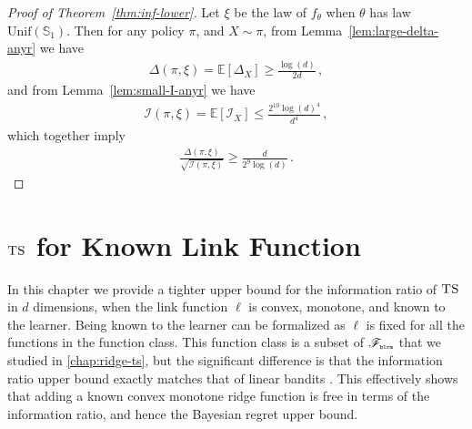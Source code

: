 \documentclass[letter, 12pt]{report}
\newcommand{\pr}{\text{\tiny\texttt{r}}}
\newcommand{\pb}{\text{\tiny\texttt{b}}}
\newcommand{\pl}{\text{\tiny\texttt{l}}}
\renewcommand{\pm}{\text{\tiny\texttt{m}}}
\newcommand{\sphere}{\mathbb{S}}
\newcommand{\brak}[1]{\left[ #1 \right]}
\newcommand{\E}{\mathbb E}
\newcommand{\sF}{\mathscr F}
\newcommand{\I}{\mathcal{I}}
\newcommand{\1}{\mathbf{1}}
\newcommand{\ts}{\textsc{TS}\xspace}
\theoremstyle{plain}
\theoremstyle{definition}
\theoremstyle{remark}
\begin{document}
\begin{proof}[Proof of Theorem~\ref{thm:inf-lower}]
    Let $\xi$ be the law of $f_\theta$ when $\theta$ has law $\text{Unif}(\sphere_1)$.
    Then for any policy $\pi$, and $X \sim \pi$,
    from Lemma~\ref{lem:large-delta-anyr} we have
    \begin{align*}
        \Delta(\pi, \xi)
        =
        \E\brak{\Delta_X}
        \geq    \frac{\log(d)}{2d}\,,
    \end{align*}
    and from Lemma~\ref{lem:small-I-anyr} we have
    \begin{align*}
        \I(\pi, \xi) = \E[\I_X] \leq \frac{2^{10}\log(d)^4}{d^4} \,,
    \end{align*}
    which together imply
    \begin{align*}
        \frac{\Delta(\pi, \xi)}{\sqrt{\I(\pi, \xi)}}
        \geq \frac{d}{2^{9}\log(d)}\,.
    \end{align*}
\end{proof}

\chapter{$\ts$ for Known Link Function}
In this chapter we provide a tighter upper bound for the
information ratio of $\ts$ in $d$ dimensions, when the link function $\ell$ is convex, monotone, and known to the learner.
Being known to the learner can be formalized as $\ell$ is fixed for all the functions in the function class.
This function class is a subset of $\sF_{\pb\pl\pr\pm}$ that we studied in \cref{chap:ridge-ts}, but the significant difference is that the information ratio upper bound exactly matches that of linear bandits \citep{RV16}.
This effectively shows that adding a known convex monotone ridge function is free in terms of the information ratio, and hence the Bayesian regret upper bound.
\end{document}
